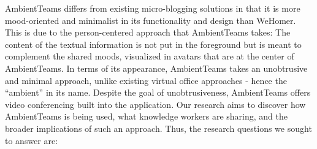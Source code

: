 AmbientTeams differs from existing micro-blogging solutions in that it is more mood-oriented and minimalist in its functionality and design than WeHomer. This is due to the person-centered approach that AmbientTeams takes: The content of the textual information is not put in the foreground but is meant to complement the shared moods, visualized in avatars that are at the center of AmbientTeams. In terms of its appearance, AmbientTeams takes an unobtrusive and minimal approach, unlike existing virtual office approaches - hence the \enquote{ambient} in its name. Despite the goal of unobtrusiveness, AmbientTeams offers video conferencing built into the application. Our research aims to discover how AmbientTeams is being used, what knowledge workers are sharing, and the broader implications of such an approach. Thus, the research questions we sought to answer are:




